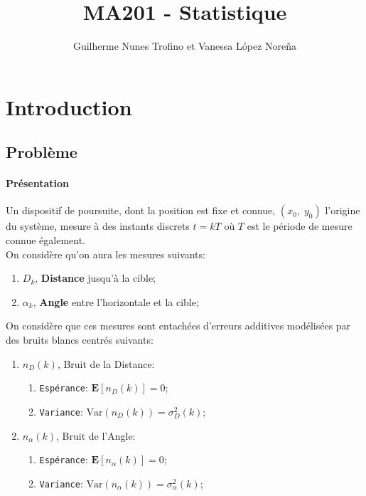 \documentclass{article}
\title{MA201 - Statistique}
\author{Guilherme Nunes Trofino et Vanessa López Noreña}
\begin{document}
\maketitle

\newpage\tableofcontents

\section*{Introduction}
\subsection*{Problème}
\paragraph{Présentation}Un dispositif de poursuite, dont la position est fixe et connue, $(x_{0}, \; y_{0})$ l'origine du système, mesure à des instants discrets $t = kT$ où $T$ est le période de mesure connue également.\\

\noindent On considère qu'on aura les mesures suivants:
\begin{enumerate}
    \item $D_{k}$, \textbf{Distance} jusqu'à la cible;
    \item $\alpha_{k}$, \textbf{Angle} entre l'horizontale et la cible;
\end{enumerate}
On considère que ces mesures sont entachées d'erreurs additives modélisées par des bruits blancs centrés suivants:
\begin{enumerate}
    \item $n_{D}(k)$, Bruit de la Distance:
    \begin{enumerate}[noitemsep]
        \item \texttt{Espérance}: $\mathbf{E}[n_{D}(k)] = 0$;
        \item \texttt{Variance}: $\text{Var}(n_{D}(k)) = \sigma_{D}^{2}(k)$;
    \end{enumerate}
    \item $n_{\alpha}(k)$, Bruit de l'Angle:
        \begin{enumerate}[noitemsep]
        \item \texttt{Espérance}: $\mathbf{E}[n_{\alpha}(k)] = 0$;
        \item \texttt{Variance}: $\text{Var}(n_{\alpha}(k)) = \sigma_{\alpha}^{2}(k)$;
    \end{enumerate}
\end{enumerate}
\end{document}

